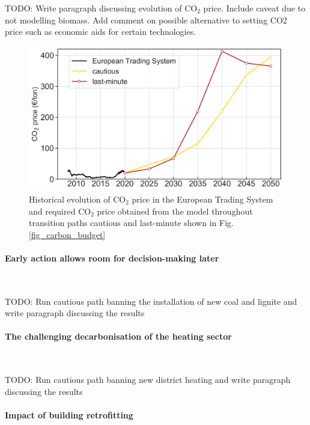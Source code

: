 \documentclass[5p]{elsarticle} %
\begin{document}
\textcolor[rgb]{1,0,0}{TODO: Write paragraph discussing evolution of CO$_2$ price. Include caveat due to not modelling biomass. Add comment on possible alternative to setting CO2 price such as economic aids for certain technologies. }

\begin{figure}[!h]
\centering
\includegraphics[width=\columnwidth]{figures/co2_price.png}
\caption{Historical evolution of CO$_2$ price in the European Trading System \cite{ETS} and required CO$_2$ price obtained from the model throughout transition paths cautious and last-minute shown in Fig. \ref{fig_carbon_budget}} \label{fig_co2price} 
\end{figure}


\paragraph{\textbf{Early action allows room for decision-making later}} \

\textcolor[rgb]{1,0,0}{TODO: Run cautious path banning the installation of new coal and lignite and write paragraph discussing the results}


\paragraph{\textbf{The challenging decarbonisation of the heating sector}} \

\textcolor[rgb]{1,0,0}{TODO: Run cautious path banning new district heating and write paragraph discussing the results}

\paragraph{\textbf{Impact of building retrofitting}} \
\end{document}
